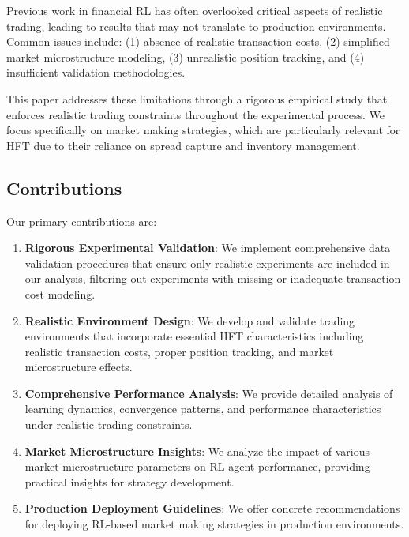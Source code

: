 \documentclass[11pt,a4paper]{article}
\begin{document}
Previous work in financial RL has often overlooked critical aspects of realistic trading, leading to results that may not translate to production environments. Common issues include: (1) absence of realistic transaction costs, (2) simplified market microstructure modeling, (3) unrealistic position tracking, and (4) insufficient validation methodologies.

This paper addresses these limitations through a rigorous empirical study that enforces realistic trading constraints throughout the experimental process. We focus specifically on market making strategies, which are particularly relevant for HFT due to their reliance on spread capture and inventory management.

\subsection{Contributions}

Our primary contributions are:

\begin{enumerate}
\item \textbf{Rigorous Experimental Validation}: We implement comprehensive data validation procedures that ensure only realistic experiments are included in our analysis, filtering out experiments with missing or inadequate transaction cost modeling.

\item \textbf{Realistic Environment Design}: We develop and validate trading environments that incorporate essential HFT characteristics including realistic transaction costs, proper position tracking, and market microstructure effects.

\item \textbf{Comprehensive Performance Analysis}: We provide detailed analysis of learning dynamics, convergence patterns, and performance characteristics under realistic trading constraints.

\item \textbf{Market Microstructure Insights}: We analyze the impact of various market microstructure parameters on RL agent performance, providing practical insights for strategy development.

\item \textbf{Production Deployment Guidelines}: We offer concrete recommendations for deploying RL-based market making strategies in production environments.
\end{enumerate}
\end{document}
